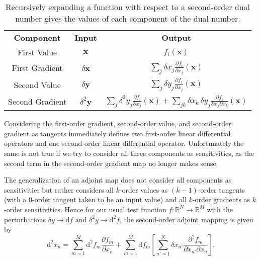 \begin{table*}[t!]
	\centering
	\renewcommand{\arraystretch}{2}
	\begin{tabular}{ccc}
	\rowcolor[gray]{0.9} \textbf{Component} & \textbf{Input} & \textbf{Output} \\
	First Value & 
	$\mathbf{x}$ & 
	$f_{i} \! \left( \mathbf{x} \right)$ 
	\\
	\rowcolor[gray]{0.9} 
	First Gradient & 
	$\delta \mathbf{x}$ &
	$\displaystyle \sum_{j} \delta x_{j}  \frac{ \partial f_{i} }{ \partial x_{j} } \! \left( \mathbf{x} \right)$
	\\
	Second Value & 
	$\delta \mathbf{y} $ & 
	$\displaystyle \sum_{j} \delta y_{j} \frac{ \partial f_{i} }{ \partial x_{j} } \! \left( \mathbf{x} \right)$
	\\
	\rowcolor[gray]{0.9} 
	Second Gradient & 
	$\delta^{2} \mathbf{y} $ & 
	$\displaystyle \sum_{j} \delta^{2} y_{j} \frac{ \partial f_{i} }{ \partial x_{j} } \! \left( \mathbf{x} \right)
	+ \sum_{jk} \delta x_{k} \, \delta y_{j}
	\frac{ \partial f_{i} }{ \partial x_{j} \partial x_{k} } \! \left( \mathbf{x} \right)$
	\\
	\end{tabular}
	\caption{Recursively expanding a function with respect to a second-order dual number 
	gives the values of each component of the dual number.
	\label{tab:secondOrder}}
\end{table*}

Considering the first-order gradient, second-order value, and second-order gradient as tangents 
immediately defines two first-order linear differential operators and one second-order linear 
differential operator.  Unfortunately the same is not true if we try to consider all three components
as sensitivities, as the second term in the second-order gradient map no longer makes
sense.  

The generalization of an adjoint map does not consider all components as sensitivities but rather
considers all $k$-order values as $(k - 1)$-order tangents (with a $0$-order tangent
taken to be an input value) and all $k$-order gradients as $k$-order sensitivities.  Hence
for our usual test function $f : \mathbb{R}^{N} \rightarrow \mathbb{R}^{M}$ with the
perturbations $\delta y \rightarrow \mathrm{d} f$ and 
$\delta^{2} y \rightarrow \mathrm{d}^{2} f$, the second-order adjoint mapping is given by
%
\begin{equation*}
\mathrm{d}^{2} x_{n}
= \sum_{m = 1}^{M} \mathrm{d}^{2} f_{m} \frac{ \partial f_{m} }{ \partial x_{n} }
+ \sum_{m = 1}^{M} \mathrm{d} f_{m} 
\left[ \sum_{n'=1}^{N} \delta x_{n'} \frac{ \partial^{2} f_{m} }{ \partial x_{n'} \partial x_{n} } \right].
\end{equation*}

